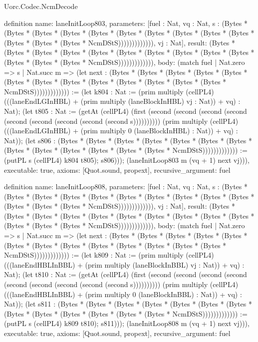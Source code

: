 \begin{lexlean}{Uorc.Codec.NcmDecode}
\begin{semanticmodule}
definition{
  name: laneInitLoop803,
  parameters: [fuel : Nat, vq : Nat, s : (Bytes * (Bytes * (Bytes * (Bytes * (Bytes * (Bytes * (Bytes * (Bytes * (Bytes * (Bytes * (Bytes * (Bytes * (Bytes * NcmDStS))))))))))))), vj : Nat],
  result: (Bytes * (Bytes * (Bytes * (Bytes * (Bytes * (Bytes * (Bytes * (Bytes * (Bytes * (Bytes * (Bytes * (Bytes * (Bytes * NcmDStS))))))))))))),
  body: (match fuel
    | Nat.zero => s
    | Nat.succ m => (let next : (Bytes * (Bytes * (Bytes * (Bytes * (Bytes * (Bytes * (Bytes * (Bytes * (Bytes * (Bytes * (Bytes * (Bytes * (Bytes * NcmDStS))))))))))))) := (let k804 : Nat := (prim multiply (cellPL4) (((laneEndLGInHBL) + (prim multiply (laneBlockInHBL) vj : Nat)) + vq) : Nat); (let t805 : Nat := (getAt (cellPL4) (first (second (second (second (second (second (second (second (second (second s)))))))))) (prim multiply (cellPL4) (((laneEndLGInHBL) + (prim multiply 0 (laneBlockInHBL) : Nat)) + vq) : Nat)); (let s806 : (Bytes * (Bytes * (Bytes * (Bytes * (Bytes * (Bytes * (Bytes * (Bytes * (Bytes * (Bytes * (Bytes * (Bytes * (Bytes * NcmDStS))))))))))))) := (putPL s (cellPL4) k804 t805); s806))); (laneInitLoop803 m (vq + 1) next vj))),
  executable: true,
  axioms: [Quot.sound, propext],
  recursive_argument: fuel
}

definition{
  name: laneInitLoop808,
  parameters: [fuel : Nat, vq : Nat, s : (Bytes * (Bytes * (Bytes * (Bytes * (Bytes * (Bytes * (Bytes * (Bytes * (Bytes * (Bytes * (Bytes * (Bytes * (Bytes * NcmDStS))))))))))))), vj : Nat],
  result: (Bytes * (Bytes * (Bytes * (Bytes * (Bytes * (Bytes * (Bytes * (Bytes * (Bytes * (Bytes * (Bytes * (Bytes * (Bytes * NcmDStS))))))))))))),
  body: (match fuel
    | Nat.zero => s
    | Nat.succ m => (let next : (Bytes * (Bytes * (Bytes * (Bytes * (Bytes * (Bytes * (Bytes * (Bytes * (Bytes * (Bytes * (Bytes * (Bytes * (Bytes * NcmDStS))))))))))))) := (let k809 : Nat := (prim multiply (cellPL4) (((laneEndHBLInBBL) + (prim multiply (laneBlockInBBL) vj : Nat)) + vq) : Nat); (let t810 : Nat := (getAt (cellPL4) (first (second (second (second (second (second (second (second (second (second s)))))))))) (prim multiply (cellPL4) (((laneEndHBLInBBL) + (prim multiply 0 (laneBlockInBBL) : Nat)) + vq) : Nat)); (let s811 : (Bytes * (Bytes * (Bytes * (Bytes * (Bytes * (Bytes * (Bytes * (Bytes * (Bytes * (Bytes * (Bytes * (Bytes * (Bytes * NcmDStS))))))))))))) := (putPL s (cellPL4) k809 t810); s811))); (laneInitLoop808 m (vq + 1) next vj))),
  executable: true,
  axioms: [Quot.sound, propext],
  recursive_argument: fuel
}


\end{semanticmodule}
\end{lexlean}

